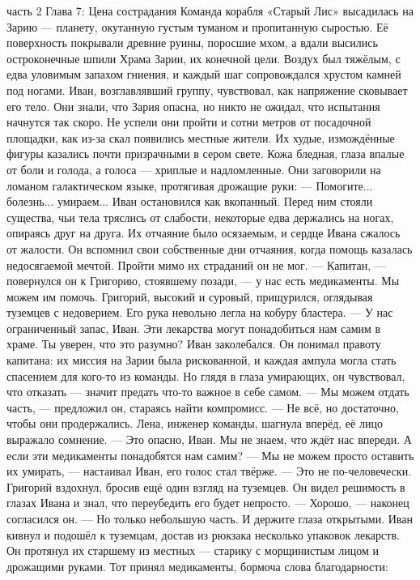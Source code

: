 \documentclass[12pt,a4paper]{book}
\begin{document}
часть 2 
Глава 7: Цена сострадания
Команда корабля «Старый Лис» высадилась на Зарию — планету, окутанную густым туманом и пропитанную сыростью. Её поверхность покрывали древние руины, поросшие мхом, а вдали высились остроконечные шпили Храма Зарии, их конечной цели. Воздух был тяжёлым, с едва уловимым запахом гниения, и каждый шаг сопровождался хрустом камней под ногами. Иван, возглавлявший группу, чувствовал, как напряжение сковывает его тело. Они знали, что Зария опасна, но никто не ожидал, что испытания начнутся так скоро.
Не успели они пройти и сотни метров от посадочной площадки, как из-за скал появились местные жители. Их худые, измождённые фигуры казались почти призрачными в сером свете. Кожа бледная, глаза впалые от боли и голода, а голоса — хриплые и надломленные. Они заговорили на ломаном галактическом языке, протягивая дрожащие руки:
— Помогите... болезнь... умираем...
Иван остановился как вкопанный. Перед ним стояли существа, чьи тела тряслись от слабости, некоторые едва держались на ногах, опираясь друг на друга. Их отчаяние было осязаемым, и сердце Ивана сжалось от жалости. Он вспомнил свои собственные дни отчаяния, когда помощь казалась недосягаемой мечтой. Пройти мимо их страданий он не мог.
— Капитан, — повернулся он к Григорию, стоявшему позади, — у нас есть медикаменты. Мы можем им помочь.
Григорий, высокий и суровый, прищурился, оглядывая туземцев с недоверием. Его рука невольно легла на кобуру бластера.
— У нас ограниченный запас, Иван. Эти лекарства могут понадобиться нам самим в храме. Ты уверен, что это разумно?
Иван заколебался. Он понимал правоту капитана: их миссия на Зарии была рискованной, и каждая ампула могла стать спасением для кого-то из команды. Но глядя в глаза умирающих, он чувствовал, что отказать — значит предать что-то важное в себе самом.
— Мы можем отдать часть, — предложил он, стараясь найти компромисс. — Не всё, но достаточно, чтобы они продержались.
Лена, инженер команды, шагнула вперёд, её лицо выражало сомнение.
— Это опасно, Иван. Мы не знаем, что ждёт нас впереди. А если эти медикаменты понадобятся нам самим?
— Мы не можем просто оставить их умирать, — настаивал Иван, его голос стал твёрже. — Это не по-человечески.
Григорий вздохнул, бросив ещё один взгляд на туземцев. Он видел решимость в глазах Ивана и знал, что переубедить его будет непросто.
— Хорошо, — наконец согласился он. — Но только небольшую часть. И держите глаза открытыми.
Иван кивнул и подошёл к туземцам, достав из рюкзака несколько упаковок лекарств. Он протянул их старшему из местных — старику с морщинистым лицом и дрожащими руками. Тот принял медикаменты, бормоча слова благодарности:
\end{document}
